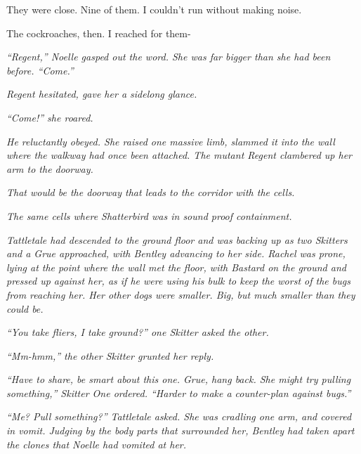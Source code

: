 They were close.  Nine of them.  I couldn't run without making noise.



The cockroaches, then.  I reached for them-



\blacksquare



\emph{``Regent,'' Noelle gasped out the word.  She was far bigger than she had been before.  ``Come.''}



\emph{Regent hesitated, gave her a sidelong glance.}



\emph{``Come!'' she roared.}



\emph{He reluctantly obeyed.  She raised one massive limb, slammed it into the wall where the walkway had once been attached.  The mutant Regent clambered up her arm to the doorway.}



\emph{That would be the doorway that leads to the corridor with the cells.}



\emph{The same cells where Shatterbird was in sound proof containment.}



\emph{Tattletale had descended to the ground floor and was backing up as two Skitters and a Grue approached, with Bentley advancing to her side.  Rachel was prone, lying at the point where the wall met the floor, with Bastard on the ground and pressed up against her, as if he were using his bulk to keep the worst of the bugs from reaching her.  Her other dogs were smaller.  Big, but much smaller than they could be.}



\emph{``You take fliers, I take ground?'' one Skitter asked the other.}



\emph{``Mm-hmm,'' the other Skitter grunted her reply.}



\emph{``Have to share, be smart about this one.  Grue, hang back.  She might try pulling something,'' Skitter One ordered.  ``Harder to make a counter-plan against bugs.''}



\emph{``Me?  Pull something?'' Tattletale asked.  She was cradling one arm, and covered in vomit.  Judging by the body parts that surrounded her, Bentley had taken apart the clones that Noelle had vomited at her.}



